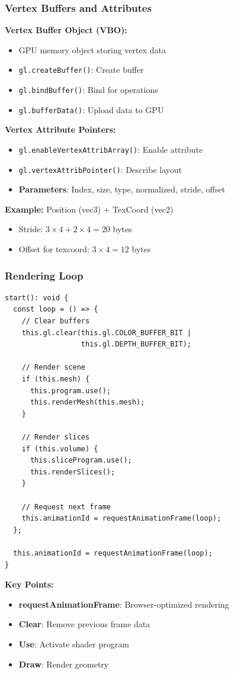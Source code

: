 \begin{frame}
\frametitle{Vertex Buffers and Attributes}

\textbf{Vertex Buffer Object (VBO):}
\begin{itemize}
  \item GPU memory object storing vertex data
  \item \texttt{gl.createBuffer()}: Create buffer
  \item \texttt{gl.bindBuffer()}: Bind for operations
  \item \texttt{gl.bufferData()}: Upload data to GPU
\end{itemize}

\vspace{0.5cm}

\textbf{Vertex Attribute Pointers:}
\begin{itemize}
  \item \texttt{gl.enableVertexAttribArray()}: Enable attribute
  \item \texttt{gl.vertexAttribPointer()}: Describe layout
  \item \textbf{Parameters}: Index, size, type, normalized, stride, offset
\end{itemize}

\vspace{0.5cm}

\textbf{Example:} Position (vec3) + TexCoord (vec2)
\begin{itemize}
  \item Stride: $3 \times 4 + 2 \times 4 = 20$ bytes
  \item Offset for texcoord: $3 \times 4 = 12$ bytes
\end{itemize}
\end{frame}

\begin{frame}
\frametitle{Rendering Loop}

\begin{lstlisting}
start(): void {
  const loop = () => {
    // Clear buffers
    this.gl.clear(this.gl.COLOR_BUFFER_BIT | 
                  this.gl.DEPTH_BUFFER_BIT);
    
    // Render scene
    if (this.mesh) {
      this.program.use();
      this.renderMesh(this.mesh);
    }
    
    // Render slices
    if (this.volume) {
      this.sliceProgram.use();
      this.renderSlices();
    }
    
    // Request next frame
    this.animationId = requestAnimationFrame(loop);
  };
  
  this.animationId = requestAnimationFrame(loop);
}
\end{lstlisting}

\textbf{Key Points:}
\begin{itemize}
  \item \textbf{requestAnimationFrame}: Browser-optimized rendering
  \item \textbf{Clear}: Remove previous frame data
  \item \textbf{Use}: Activate shader program
  \item \textbf{Draw}: Render geometry
\end{itemize}
\end{frame}

